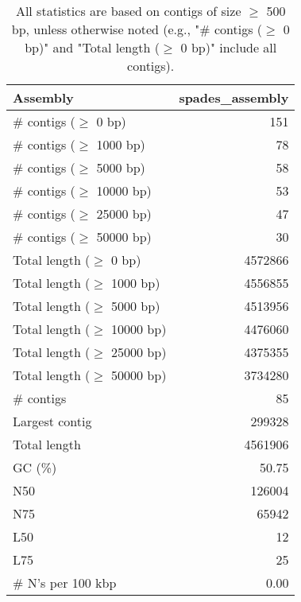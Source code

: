 \documentclass[12pt,a4paper]{article}
\begin{document}
\begin{table}[ht]
\begin{center}
\caption{All statistics are based on contigs of size $\geq$ 500 bp, unless otherwise noted (e.g., "\# contigs ($\geq$ 0 bp)" and "Total length ($\geq$ 0 bp)" include all contigs).}
\begin{tabular}{|l*{1}{|r}|}
\hline
Assembly & spades\_assembly \\ \hline
\# contigs ($\geq$ 0 bp) & 151 \\ \hline
\# contigs ($\geq$ 1000 bp) & 78 \\ \hline
\# contigs ($\geq$ 5000 bp) & 58 \\ \hline
\# contigs ($\geq$ 10000 bp) & 53 \\ \hline
\# contigs ($\geq$ 25000 bp) & 47 \\ \hline
\# contigs ($\geq$ 50000 bp) & 30 \\ \hline
Total length ($\geq$ 0 bp) & 4572866 \\ \hline
Total length ($\geq$ 1000 bp) & 4556855 \\ \hline
Total length ($\geq$ 5000 bp) & 4513956 \\ \hline
Total length ($\geq$ 10000 bp) & 4476060 \\ \hline
Total length ($\geq$ 25000 bp) & 4375355 \\ \hline
Total length ($\geq$ 50000 bp) & 3734280 \\ \hline
\# contigs & 85 \\ \hline
Largest contig & 299328 \\ \hline
Total length & 4561906 \\ \hline
GC (\%) & 50.75 \\ \hline
N50 & 126004 \\ \hline
N75 & 65942 \\ \hline
L50 & 12 \\ \hline
L75 & 25 \\ \hline
\# N's per 100 kbp & 0.00 \\ \hline
\end{tabular}
\end{center}
\end{table}
\end{document}
